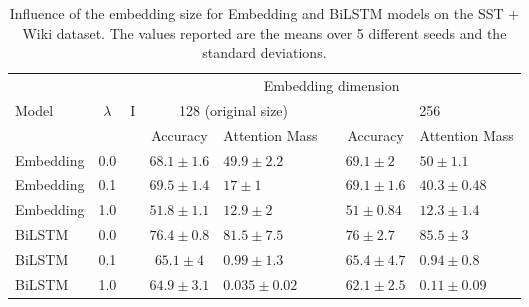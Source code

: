 

\begin{table}[b]
\centering
\caption{Influence of the embedding size for Embedding and BiLSTM models on the SST + Wiki dataset. The values reported are the means over 5 different seeds and the standard deviations.}
\label{tab:embedding-results-1}
\begin{tabular}{lcccllll} 
\toprule
          &           &   & \multicolumn{5}{c}{Embedding dimension}                                                             \\
Model     & $\lambda$ & I & \multicolumn{2}{c}{128 (original size)}   &  & \multicolumn{2}{c}{256}                              \\ 
\cline{4-5}\cline{7-8}
          &           &   & Accuracy           & \multicolumn{1}{c}{Attention Mass} &  & \multicolumn{1}{c}{Accuracy} & \multicolumn{1}{c}{Attention Mass}  \\ 
\midrule
Embedding & 0.0       &   & $68.1 \pm 1.6$ & $49.9 \pm 2.2$           &  & $69.1 \pm 2$             & $50 \pm 1.1$              \\
Embedding & 0.1       &   & $69.5 \pm 1.4$ & $17 \pm 1$               &  & $69.1 \pm 1.6$           & $40.3 \pm 0.48$           \\
Embedding & 1.0       &   & $51.8 \pm 1.1$ & $12.9 \pm 2$             &  & $51 \pm 0.84$            & $12.3 \pm 1.4$            \\ 
\midrule
BiLSTM    & 0.0       &   & $76.4 \pm 0.8$ & $81.5 \pm 7.5$           &  & $76 \pm 2.7$             & $85.5 \pm 3$              \\
BiLSTM    & 0.1       &   & $65.1 \pm 4$   & $0.99 \pm 1.3$           &  & $65.4 \pm 4.7$           & $0.94 \pm 0.8$            \\
BiLSTM    & 1.0       &   & $64.9 \pm 3.1$ & $0.035 \pm 0.02$         &  & $62.1 \pm 2.5$           & $0.11 \pm 0.09$           \\
\bottomrule
\end{tabular}
\end{table}

